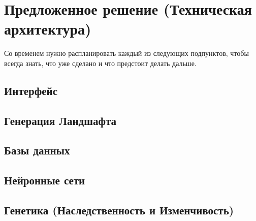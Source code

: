 \documentclass[12pt,a4paper, titlepage]{article}
\begin{document}
\section{Предложенное решение (Техническая архитектура)}
Со временем нужно распланировать каждый из следующих подпунктов, чтобы всегда знать, что уже сделано и что предстоит делать дальше.
\subsection{Интерфейс}
\subsection{Генерация Ландшафта}
\subsection{Базы данных}
\subsection{Нейронные сети}
\subsection{Генетика (Наследственность и Изменчивость)}
\end{document}
